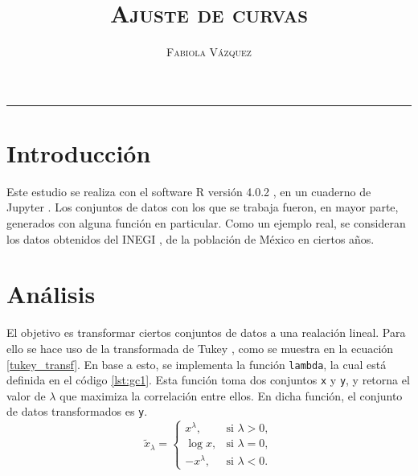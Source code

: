 \documentclass[12pt,letterpaper]{article}
\title{\textsc{Ajuste de curvas}}
\author{\textsc{Fabiola Vázquez}}
\begin{document}
\maketitle

\hrule
\section{Introducción}
Este estudio se realiza con el software R versión 4.0.2 \cite{R}, en un cuaderno de Jupyter \cite{jupyter}. Los conjuntos de datos con los que se trabaja fueron, en mayor parte, generados con alguna función en particular. Como un ejemplo real, se consideran los datos obtenidos del INEGI \cite{inegi}, de la población de México en ciertos años.

\section{Análisis}
El objetivo es transformar ciertos conjuntos de datos a una realación lineal. Para ello se hace uso de la transformada de Tukey \cite{Laneonline}, como se muestra en la ecuación \ref{tukey_transf}. En base a esto, se implementa la función \texttt{lambda}, la cual está definida en el código \ref{lst:gc1}. Esta función toma dos conjuntos \texttt{x} y \texttt{y}, y retorna el valor de $\lambda$ que maximiza la correlación entre ellos. En dicha función, el conjunto de datos transformados es \texttt{y}.
\begin{equation} \label{tukey_transf}
\displaystyle \tilde{x}_\lambda = \begin{cases} 
 x^{\lambda}, & \text{si } \lambda >0, \\  
 \log x, & \text{si } \lambda = 0, \\  
 -x^{\lambda}, & \text{si } \lambda < 0.  
 \end{cases} 
\end{equation}
\end{document}
